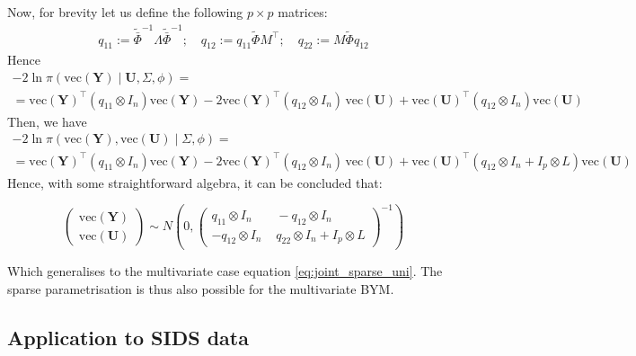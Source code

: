 \documentclass[
]{article}
\begin{document}
Now, for brevity let us define the following \(p \times p\) matrices:
\begin{align*}
q_{11} := \tilde{\bar{\Phi}}^{-1} \Lambda \tilde{\bar{\Phi}}^{-1} ; \quad
q_{12}:= q_{11} \tilde{\Phi}M^\top; \quad
q_{22}:= M \tilde{\Phi} q_{12}
\end{align*} Hence \begin{align*}
-2 \ln \pi \left(\mathrm{vec}(\mathbf{Y}) \mid \mathbf{U}, \Sigma, \phi \right) = \\
= \mathrm{vec}(\mathbf{Y})^{\top}
\left(q_{11} \otimes I_n \right) 
\mathrm{vec}(\mathbf{Y}) 
- 2\mathrm{vec}(\mathbf{Y})^{\top} 
\left(  q_{12} \otimes I_n \right)  \,\mathrm{vec}(\mathbf{U})  
+  \mathrm{vec}(\mathbf{U})^{\top}
    \left(q_{12} \otimes I_n \right)
   \mathrm{vec}(\mathbf{U})
\end{align*} Then, we have \begin{align*}
-2 \ln \pi \left(\mathrm{vec}(\mathbf{Y}), \mathrm{vec}(\mathbf{U}) \mid \Sigma, \phi \right) = \\
= \mathrm{vec}(\mathbf{Y})^{\top}
\left(q_{11} \otimes I_n \right) 
\mathrm{vec}(\mathbf{Y}) 
- 2\mathrm{vec}(\mathbf{Y})^{\top} 
\left(  q_{12} \otimes I_n \right)  \,\mathrm{vec}(\mathbf{U})  
+  \mathrm{vec}(\mathbf{U})^{\top}
    \left(q_{12} \otimes I_n + I_p \otimes L\right)
   \mathrm{vec}(\mathbf{U})
\end{align*} Hence, with some straightforward algebra, it can be
concluded that:

\begin{equation} \label{eq:joint_bym_mmod}
    \begin{pmatrix}
        \mathrm{vec} (\mathbf{Y}) \\ \mathrm{vec} (\mathbf{U}) 
    \end{pmatrix}
    \sim N \left( 0, \begin{pmatrix}
            q_{11} \otimes I_n \, & 
            \, - q_{12} \otimes I_n \\
            - q_{12} \otimes I_n \, & \,
             q_{22} \otimes I_n + I_p \otimes L
        \end{pmatrix}^{-1} \right)
\end{equation}

Which generalises to the multivariate case equation
\ref{eq:joint_sparse_uni}. The sparse parametrisation is thus also
possible for the multivariate BYM.

\subsection{Application to SIDS data}\label{application-to-sids-data}
\end{document}
